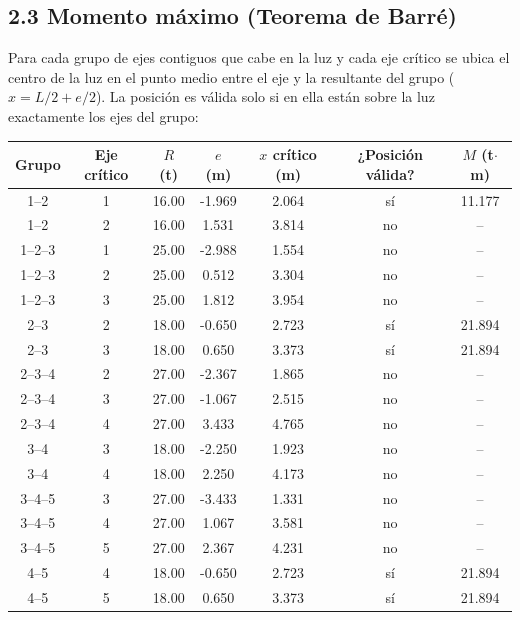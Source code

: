 \documentclass[11pt,a4paper]{article}
\begin{document}
\subsection*{2.3 Momento máximo (Teorema de Barré)}
Para cada grupo de ejes contiguos que cabe en la luz y cada eje crítico se ubica el centro de la luz en el punto
medio entre el eje y la resultante del grupo ($x = L/2 + e/2$). La posición es válida solo si en ella están
sobre la luz exactamente los ejes del grupo:

\begin{center}\small
\begin{tabular}{ccccccc}
\toprule
Grupo & Eje crítico & $R$ (t) & $e$ (m) & $x$ crítico (m) & ¿Posición válida? & $M$ (t$\cdot$m)\\
\midrule
1--2 & 1 & 16.00 & -1.969 & 2.064 & \textcolor{ok}{sí} & 11.177 \\
1--2 & 2 & 16.00 & 1.531 & 3.814 & \textcolor{mal}{no} & -- \\
1--2--3 & 1 & 25.00 & -2.988 & 1.554 & \textcolor{mal}{no} & -- \\
1--2--3 & 2 & 25.00 & 0.512 & 3.304 & \textcolor{mal}{no} & -- \\
1--2--3 & 3 & 25.00 & 1.812 & 3.954 & \textcolor{mal}{no} & -- \\
2--3 & 2 & 18.00 & -0.650 & 2.723 & \textcolor{ok}{sí} & 21.894 \\
2--3 & 3 & 18.00 & 0.650 & 3.373 & \textcolor{ok}{sí} & 21.894 \\
2--3--4 & 2 & 27.00 & -2.367 & 1.865 & \textcolor{mal}{no} & -- \\
2--3--4 & 3 & 27.00 & -1.067 & 2.515 & \textcolor{mal}{no} & -- \\
2--3--4 & 4 & 27.00 & 3.433 & 4.765 & \textcolor{mal}{no} & -- \\
3--4 & 3 & 18.00 & -2.250 & 1.923 & \textcolor{mal}{no} & -- \\
3--4 & 4 & 18.00 & 2.250 & 4.173 & \textcolor{mal}{no} & -- \\
3--4--5 & 3 & 27.00 & -3.433 & 1.331 & \textcolor{mal}{no} & -- \\
3--4--5 & 4 & 27.00 & 1.067 & 3.581 & \textcolor{mal}{no} & -- \\
3--4--5 & 5 & 27.00 & 2.367 & 4.231 & \textcolor{mal}{no} & -- \\
4--5 & 4 & 18.00 & -0.650 & 2.723 & \textcolor{ok}{sí} & 21.894 \\
4--5 & 5 & 18.00 & 0.650 & 3.373 & \textcolor{ok}{sí} & 21.894 \\
\bottomrule
\end{tabular}
\end{center}
\end{document}
